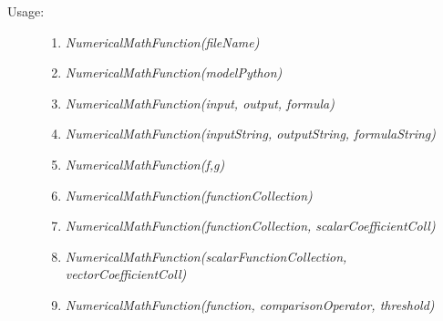 \begin{description}

\item[Usage:] \rule{0pt}{1em}
\begin{enumerate}
\item \textit{NumericalMathFunction(fileName)}
\item \textit{NumericalMathFunction(modelPython)}
\item \textit{NumericalMathFunction(input, output, formula)}
\item \textit{NumericalMathFunction(inputString, outputString, formulaString)}
\item \textit{NumericalMathFunction(f,g)}
\item \textit{NumericalMathFunction(functionCollection)}
\item \textit{NumericalMathFunction(functionCollection, scalarCoefficientColl)}
\item \textit{NumericalMathFunction(scalarFunctionCollection, vectorCoefficientColl)}
\item \textit{NumericalMathFunction(function, comparisonOperator, threshold)}
\end{enumerate}


\end{description}
